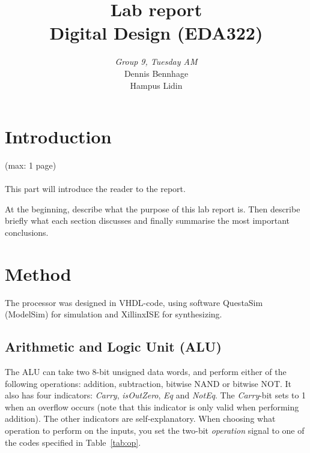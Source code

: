 \documentclass[a4,11pt]{article}
\begin{document}
\pagestyle{empty}
\begin{titlepage}

	\title{\Huge{Lab report} \\[0.1cm] \Large{Digital Design (EDA322)} \\[0.4cm]}
	\author{\large{\emph{Group 9, Tuesday AM}} \\[0.2cm] Dennis Bennhage \\[0.05cm] Hampus Lidin \\[0.1cm]}
	\maketitle
	\thispagestyle{empty}
\end{titlepage}
\clearpage
\pagestyle{fancyplain}
\tableofcontents
\clearpage
\setcounter{page}{1}
\section{Introduction}
(max: 1 page)
\\\\
This part will introduce the reader to the report. 

At the beginning, describe what the purpose of this lab report is. Then describe briefly what each section discusses and finally summarise the most important conclusions. 

\section{Method}
The processor was designed in VHDL-code, using software QuestaSim (ModelSim) for simulation and
XillinxISE for synthesizing. 

\subsection{Arithmetic and Logic Unit (ALU)}

The ALU can take two 8-bit unsigned data words, and perform either of the following operations:
addition, subtraction, bitwise NAND or bitwise NOT. It also has four indicators: {\it Carry},
{\it isOutZero}, {\it Eq} and {\it NotEq}. The {\it Carry}-bit sets to 1 when an overflow occurs
(note that this indicator is only valid when performing addition). The other indicators are
self-explanatory. When choosing what operation to perform on the inputs, you set the two-bit
{\it operation} signal to one of the codes specified in Table~\ref{tab:op}.
\end{document}
